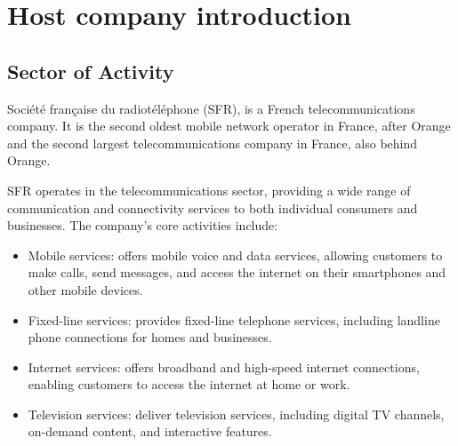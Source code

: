 \chapter{Host company introduction}

\startcontents[chapters]

\section{Sector of Activity}

Société française du radiotéléphone (SFR), is a French telecommunications company. It is the second oldest mobile network operator in France, after Orange and the second largest telecommunications company in France, also behind Orange.

SFR operates in the telecommunications sector, providing a wide range of communication and connectivity services to both individual consumers and businesses. The company's core activities include:

\begin{itemize}

    \item  Mobile services: offers mobile voice and data services, allowing customers to make calls, send messages, and access the internet on their smartphones and other mobile devices.

    \item Fixed-line services: provides fixed-line telephone services, including landline phone connections for homes and businesses.

    \item Internet services: offers broadband and high-speed internet connections, enabling customers to access the internet at home or work.

    \item Television services: deliver television services, including digital TV channels, on-demand content, and interactive features.

\end{itemize}

